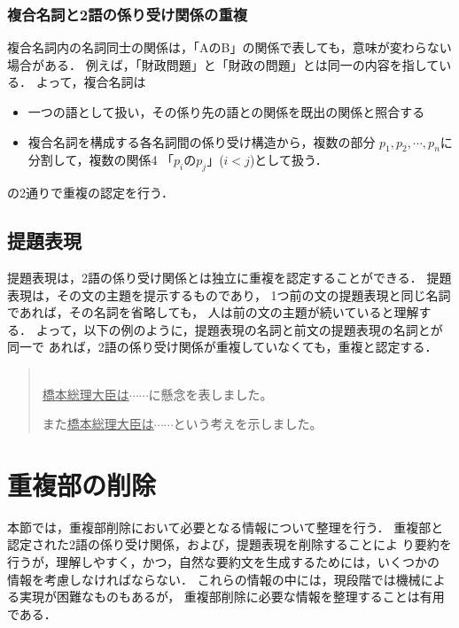 \subsubsection{複合名詞と2語の係り受け関係の重複} \label{nintei_choufuku_fukugou}
複合名詞内の名詞同士の関係は，「AのB」の関係で表しても，意味が変わらない
場合がある．
例えば，「財政問題」と「財政の問題」とは同一の内容を指している．
よって，複合名詞は
 \setlength{\itemsep}{-1.5mm}
\begin{itemize}

 \item 一つの語として扱い，その係り先の語との関係を既出の関係と照合する
 \item 複合名詞を構成する各名詞間の係り受け構造から，複数の部分
       $p_{1},p_{2},\cdots,p_{n}$に分割して，複数の関係4
       「$p_{i}$の$p_{j}$」($i<j$)として扱う．
\end{itemize}
の2通りで重複の認定を行う．

\subsection{提題表現} \label{nintei_teidai}
提題表現は，2語の係り受け関係とは独立に重複を認定することができる．
提題表現は，その文の主題を提示するものであり，
1つ前の文の提題表現と同じ名詞であれば，その名詞を省略しても，
人は前の文の主題が続いていると理解する．
よって，以下の例のように，提題表現の名詞と前文の提題表現の名詞とが同一で
あれば，2語の係り受け関係が重複していなくても，重複と認定する．
\vspace{5mm}
\begin{quote} \label{rei:rei4}
\hspace*{-1em}{\bf 例4：}\\
 \underline{橋本総理大臣は}$\cdots\cdots$に懸念を表しました。

 また\underline{橋本総理大臣は}$\cdots\cdots$という考えを示しました。
\end{quote}
\section{重複部の削除} \label{sakujo}
本節では，重複部削除において必要となる情報について整理を行う．
重複部と認定された2語の係り受け関係，および，提題表現を削除することによ
り要約を行うが，理解しやすく，かつ，自然な要約文を生成するためには，いくつかの
情報を考慮しなければならない．
これらの情報の中には，現段階では機械による実現が困難なものもあるが，
重複部削除に必要な情報を整理することは有用である．

